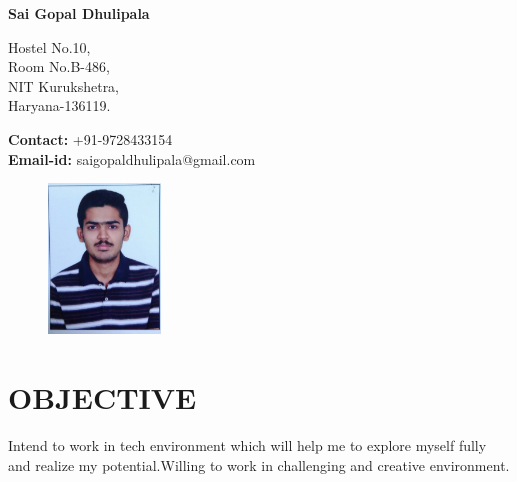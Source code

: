 \documentclass[a4paper]{article}
\begin{document}
\begin{LARGE}
       \begin{center}
         \textrm{\textbf{Sai Gopal Dhulipala}}
       \end{center} 
     \noindent\makebox[\linewidth]{\rule{\paperwidth}{0.4pt}}
\end{LARGE}
   \begin{Large}

     \begin{minipage}[t]{0.5\textwidth}
        Hostel No.10,\\
        Room No.B-486,\\
        NIT Kurukshetra,\\
        Haryana-136119.
     \end{minipage}
     \begin{minipage}[t]{0.5\textwidth}
        \textbf{Contact:} +91-9728433154\\
        \textbf{Email-id:} saigopaldhulipala@gmail.com
     \end{minipage}
   \end{Large}
   \begin{figure}[h]
         \begin{flushright}
           \includegraphics[width=3cm,height=4cm]{DSG.jpg}
         \end{flushright}
     \end{figure}
     \section*{\textbf{OBJECTIVE}}
Intend to work in tech environment which will help me to explore myself fully and realize my potential.Willing to work in challenging and creative environment.
\end{document}
